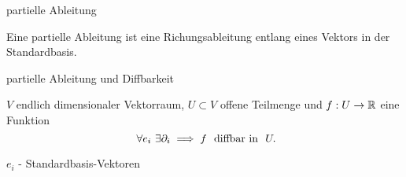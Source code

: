 \documentclass[class=article, crop=false]{standalone}
\begin{document}
\begin{zettel}{partielle Ableitung}
\begin{flashcard}[]{}
	\begin{definition}
		Eine partielle Ableitung ist eine Richungsableitung entlang eines Vektors in der Standardbasis.
	\end{definition}
\end{flashcard}

\begin{flashcard}[]{}
	\begin{question}
		partielle Ableitung und Diffbarkeit
	\end{question}
	\begin{theorem}
		$V$ endlich dimensionaler Vektorraum, $U \subset  V$ offene Teilmenge und $f: U \to  \mathbb{R} $ eine Funktion
		\[
			\forall e_i \exists \partial _i \implies f \tx{ diffbar in } U
		.\]

		$e_i$ - Standardbasis-Vektoren
	\end{theorem}
\end{flashcard}

\end{zettel}
\end{document}
